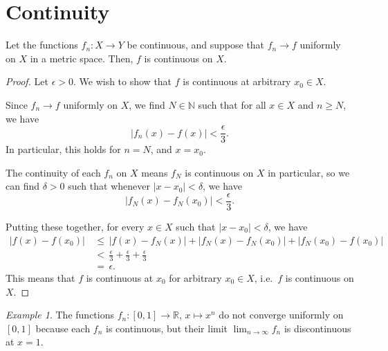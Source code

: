 \documentclass[11pt]{article}
\def\R{\mathbb{R}}
\def\N{\mathbb{N}}
\theoremstyle{definition}
\theoremstyle{remark}
\newtheorem*{example}{Example}
\numberwithin{equation}{module}
\begin{document}
    \section{Continuity}
    \begin{theorem}
        Let the functions $f_n\colon X \to Y$ be continuous, and suppose that 
        $f_n \to f$ uniformly on $X$ in a metric space. Then, $f$ is continuous on
        $X$.
    \end{theorem}
    \begin{proof}
        Let $\epsilon > 0$. We wish to show that $f$ is continuous at 
        arbitrary $x_0 \in X$.
        
        Since $f_n \to f$ uniformly on $X$, we find $N \in \N$ such that for all $x
        \in X$ and $n \geq N$, we have \[
            |f_n(x) - f(x)| < \frac{\epsilon}{3}.
        \] In particular, this holds for $n = N$, and $x = x_0$.
        
        The continuity of each $f_n$ on $X$ means $f_N$ is
        continuous on $X$ in particular, so we can find $\delta > 0$ such that 
        whenever $|x - x_0| < \delta$, we have \[
            |f_N(x) - f_N(x_0)| < \frac{\epsilon}{3}.
        \]

        Putting these together, for every $x \in X$ such that $|x - x_0| < \delta$,
        we have
        \begin{align*}
            |f(x) - f(x_0)| 
                \,&\leq\, |f(x) - f_N(x)| + |f_N(x) - f_N(x_0)| + 
                    |f_N(x_0) - f(x_0)| \\
                \,&<\, \frac{\epsilon}{3} + \frac{\epsilon}{3} +
                    \frac{\epsilon}{3} \\
                \,&=\, \epsilon.
        \end{align*}
        This means that $f$ is continuous at $x_0$ for arbitrary $x_0 \in X$, i.e.\
        $f$ is continuous on $X$.
    \end{proof}
    \begin{example}
        The functions $f_n\colon [0, 1] \to \R$, $x \mapsto x^n$ do not converge
        uniformly on $[0, 1]$ because each $f_n$ is continuous, but their limit 
        $\lim_{n \to \infty} f_n$ is discontinuous at $x = 1$.
    \end{example}
    
\end{document}
